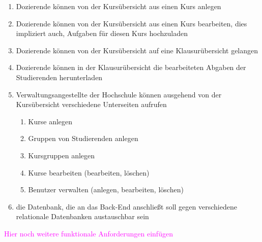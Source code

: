 \begin{enumerate}
	\item \gls{Dozierende} können von der Kursübersicht aus einen \gls{Kurs} anlegen
	\item \gls{Dozierende} können von der Kursübersicht aus einen \gls{Kurs} bearbeiten, dies impliziert auch, \gls{Aufgabe}n für diesen \gls{Kurs} hochzuladen
	\item \gls{Dozierende} können von der Kursübersicht auf eine Klausurübersicht gelangen
	\item \gls{Dozierende} können in der Klausurübersicht die \gls{bearbeitete}n Abgaben der \gls{Studierende}n herunterladen
	\item \gls{Verwaltungsangestellte} der Hochschule können ausgehend von der Kursübersicht verschiedene Unterseiten aufrufen
	\begin{enumerate}
		\item \gls{Kurs}e anlegen
	 	\item Gruppen von \gls{Studierende}n anlegen
		\item Kursgruppen anlegen
		\item \gls{Kurs}e bearbeiten (bearbeiten, löschen)
		\item Benutzer verwalten (anlegen, bearbeiten, löschen)
	\end{enumerate}	 
	\item die Datenbank, die an das \gls{Back-End} anschließt soll gegen verschiedene \gls{relationale Datenbank}en austauschbar sein
\end{enumerate}

\textcolor{magenta}{Hier noch weitere funktionale Anforderungen einfügen}